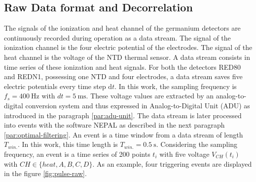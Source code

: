 \subsection{Raw Data format and Decorrelation}
\label{par:data-format}

The signals of the ionization and heat channel of the germanium detectors are continuously recorded during operation as a data stream. The signal of the ionization channel is the four electric potential of the electrodes. The signal of the heat channel is the voltage of the NTD thermal sensor. A data stream consists in time series of these ionization and heat signals. For both the detectors RED80 and REDN1, possessing one NTD and four electrodes, a data stream saves five electric potentials every time step $\mathrm{d}t$. In this work, the sampling frequency is $f_s = \SI{400}{\Hz}$ with $dt = \SI{5}{\milli\s}$. These voltage values are extracted by an analog-to-digital conversion system and thus expressed in Analog-to-Digital Unit (ADU) as introduced in the paragraph \ref{par:adu-unit}. The data stream is later processed into events with the software NEPAL as described in the next paragraph \ref{par:optimal-filtering}. An event is a time window from a data stream of length $T_{win.}$. In this work, this time length is $T_{win.}=\SI{0.5}{\s}$. Considering the sampling frequency, an event is a time series of 200 points $t_i$ with five voltage $V_{CH}(t_i)$ with $CH \in \{ heat, A, B, C, D \}$. As an example, four triggering events are displayed in the figure \ref{fig:pulse-raw}.

